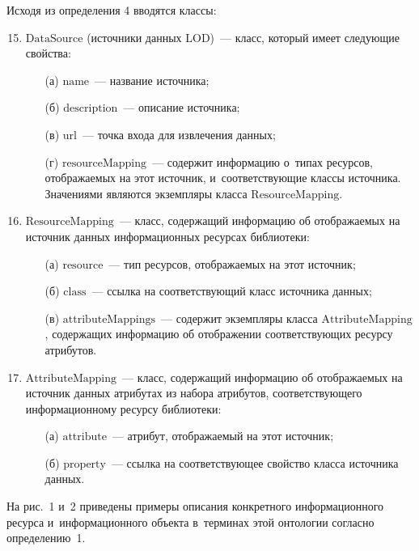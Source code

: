 \begin{multicols}{2}
Исходя из определения 4 вводятся классы:
\begin{enumerate}[1.]
\setcounter{enumi}{14}
\item $\mathrm{DataSource}$ (источники данных LOD)~--- класс, который имеет 
следующие свойства:
\begin{itemize}
\item[(а)]  $\mathrm{name}$~--- название источника;
\item[(б)] $\mathrm{description}$~--- описание источника;
\item[(в)] $\mathrm{url}$~--- точка входа для извлечения данных;
\item[(г)] $\mathrm{resourceMapping}$~--- содержит информацию о~типах 
ресурсов, отображаемых на этот источник, и~со\-от\-вет\-ст\-ву\-ющие классы 
источника. Значениями являются экземпляры класса 
$\mathrm{ResourceMapping}$.
\end{itemize}
\item $\mathrm{ResourceMapping}$~--- класс, содержащий информацию об 
отображаемых на источник данных информационных ресурсах 
библиотеки:
\begin{itemize}
\item[(а)] $\mathrm{resource}$~--- тип ресурсов, отображаемых на этот 
источник;
\item[(б)] $\mathrm{class}$~--- ссылка на соответствующий класс 
источника данных;
\item[(в)] $\mathrm{attributeMappings}$~--- содержит экземпляры класса 
$\mathrm{AttributeMapping}$, содержащих информацию об отображении 
со\-от\-вет\-ст\-ву\-ющих ресурсу атрибутов.
\end{itemize}
\item $\mathrm{AttributeMapping}$~--- класс, содержащий информацию об 
отображаемых на источник данных атрибутах из набора атрибутов, 
со\-от\-вет\-ст\-ву\-юще\-го информационному ресурсу библиотеки:
\begin{itemize}
\item[(а)] $\mathrm{attribute}$~--- атрибут, отображаемый на этот 
источник;
\item[(б)] $\mathrm{property}$~--- ссылка на соответствующее свойство 
класса источника данных.
\end{itemize}
\end{enumerate}

     На рис.~1 и~2 приведены примеры описания конкретного 
информационного ресурса и~информационного объекта в~терминах этой 
онтологии согласно определению~1. 




\end{multicols}
